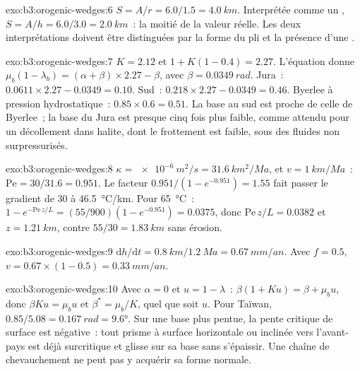 \begin{solution}{exo:b3:orogenic-wedges:6}
$S = A/r = 6.0/1.5 = \qty{4.0}{km}$. Interprétée comme un , $S = A/h =
6.0/3.0 = \qty{2.0}{km}$~: la moitié de la valeur réelle. Les deux interprétations doivent être
distinguées par la forme du pli et la présence d'une .
\end{solution}

\begin{solution}{exo:b3:orogenic-wedges:7}
$K = 2.12$ et $1 + K(1 - 0.4) = 2.27$. L'équation donne $\mu_b(1 -
\lambda_b) = (\alpha + \beta)\times2.27 - \beta$, avec $\beta =
\qty{0.0349}{rad}$. Jura~: $0.0611\times2.27 - 0.0349 = 0.10$. Sud~:
$0.218\times2.27 - 0.0349 = 0.46$. Byerlee à pression hydrostatique~:
$0.85\times0.6 = 0.51$. La base au sud est proche de celle de Byerlee~; la
base du Jura est presque cinq fois plus faible, comme attendu pour un décollement dans
halite, dont le frottement est faible, sous des fluides non surpressurisés.
\end{solution}

\begin{solution}{exo:b3:orogenic-wedges:8}
$\kappa = \qty{e-6}{m^2/s} = \qty{31.6}{km^2/Ma}$, et $v =
\qty{1}{km/Ma}$~: $\mathrm{Pe} = 30/31.6 = 0.951$. Le facteur $0.951/(1 -
e^{-0.951}) = 1.55$ fait passer le gradient de 30 à \qty{46.5}{\celsius/km}.
Pour \qty{65}{\celsius}~: $1 - e^{-\mathrm{Pe}\,z/L} = (55/900)(1 - e^{-0.951})
= 0.0375$, donc $\mathrm{Pe}\,z/L = 0.0382$ et $z = \qty{1.21}{km}$, contre
$55/30 = \qty{1.83}{km}$ sans érosion.
\end{solution}

\begin{solution}{exo:b3:orogenic-wedges:9}
$\mathrm dh/\mathrm dt = \qty{0.8}{km}/\qty{1.2}{Ma} = \qty{0.67}{mm/an}$.
Avec $f = 0.5$, $v = 0.67\times(1 - 0.5) = \qty{0.33}{mm/an}$.
\end{solution}

\begin{solution}{exo:b3:orogenic-wedges:10}
Avec $\alpha = 0$ et $u = 1 - \lambda$~: $\beta(1 + Ku) = \beta + \mu_b u$,
donc $\beta Ku = \mu_b u$ et $\beta^* = \mu_b/K$, quel que soit $u$. Pour Taïwan,
$0.85/5.08 = \qty{0.167}{rad} = \ang{9.6}$. Sur une base plus pentue, la
pente critique de surface est négative~: tout prisme à surface horizontale ou inclinée vers l'avant-pays
est déjà surcritique et glisse sur sa base sans s'épaissir. Une
chaîne de chevauchement ne peut pas y acquérir sa forme normale.
\end{solution}

